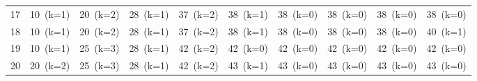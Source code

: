 \documentclass[12pt]{article}
\begin{document}
\begin{landscape}
\begin{longtable}{cccccccccc}
17 & \cellcolor{green!40}10~(k=1) & \cellcolor{green!40}20~(k=2) & \cellcolor{green!40}28~(k=1) & \cellcolor{green!40}37~(k=2) & \cellcolor{green!40}38~(k=1) & \cellcolor{red!20}38~(k=0) & \cellcolor{red!20}38~(k=0) & \cellcolor{red!20}38~(k=0) & \cellcolor{red!20}38~(k=0) \\
18 & \cellcolor{green!40}10~(k=1) & \cellcolor{green!40}20~(k=2) & \cellcolor{green!40}28~(k=1) & \cellcolor{green!40}37~(k=2) & \cellcolor{green!40}38~(k=1) & \cellcolor{red!20}38~(k=0) & \cellcolor{red!20}38~(k=0) & \cellcolor{red!20}38~(k=0) & \cellcolor{green!40}40~(k=1) \\
19 & \cellcolor{green!40}10~(k=1) & \cellcolor{green!40}25~(k=3) & \cellcolor{green!40}28~(k=1) & \cellcolor{green!40}42~(k=2) & \cellcolor{red!20}42~(k=0) & \cellcolor{red!20}42~(k=0) & \cellcolor{red!20}42~(k=0) & \cellcolor{red!20}42~(k=0) & \cellcolor{red!20}42~(k=0) \\
20 & \cellcolor{green!40}20~(k=2) & \cellcolor{green!40}25~(k=3) & \cellcolor{green!40}28~(k=1) & \cellcolor{green!40}42~(k=2) & \cellcolor{green!40}43~(k=1) & \cellcolor{red!20}43~(k=0) & \cellcolor{red!20}43~(k=0) & \cellcolor{red!20}43~(k=0) & \cellcolor{yellow!50}43~(k=0) \\
\bottomrule
\end{longtable}
\end{landscape}
\end{document}
